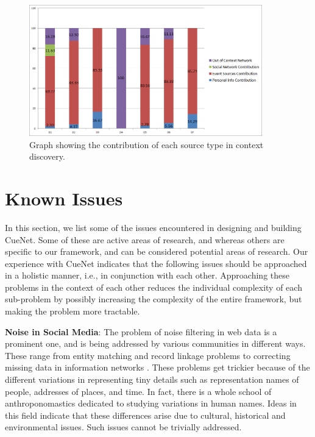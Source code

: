 \begin{figure}[t]
\centering
\includegraphics[width=0.9\textwidth]{media/discovery-distro-stacked-2.png}
\caption{Graph showing the contribution of each source type in context discovery.}
\label{fig:tag-distribution}
\end{figure}

\section{Known Issues}
In this section, we list some of the issues encountered in designing and building CueNet. Some of these are active areas of research, and whereas others are specific to our framework, and can be considered potential areas of research. Our experience with CueNet indicates that the following issues should be approached in a holistic manner, i.e., in conjunction with each other. Approaching these problems in the context of each other reduces the individual complexity of each sub-problem by possibly increasing the complexity of the entire framework, but making the problem more tractable.

\textbf{\textbf{Noise in Social Media}}: The problem of noise filtering in web data is a prominent one, and is being addressed by various communities in different ways. These range from entity matching and record linkage problems \cite{elmagarmid2007duplicate} to correcting missing data in information networks \cite{sadikov2011correcting}. These problems get trickier because of the different variations in representing tiny details such as representation names of people, addresses of places, and time. In fact, there is a whole school of anthroponomastics \cite{schneider2009s} dedicated to studying variations in human names. Ideas in this field indicate that these differences arise due to cultural, historical and environmental issues\cite{al2009socio}. Such issues cannot be trivially addressed. 

